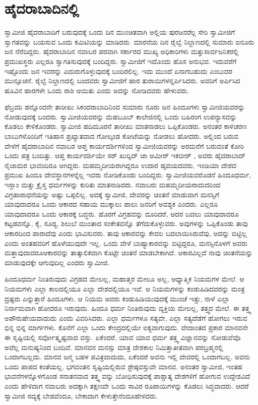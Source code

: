 
\chapter{ಹೈದರಾಬಾದಿನಲ್ಲಿ}

 ಸ್ವಾಮೀಜಿ ಹೈದರಾಬಾದಿಗೆ ಬರುವುದಕ್ಕೆ ಒಂದು ದಿನ ಮುಂಚಿತವಾಗಿ ಅಲ್ಲಿಯ ಪುರಜನರೆಲ್ಲ ಸೇರಿ ಸ್ವಾಮೀಜಿಗೆ ಸ್ವಾಗತವನ್ನು ಬಯಸುವ ಒಂದು ಕಮಿಟಿಯನ್ನು ಮಾಡಿದರು. ಮಾರನೆಯ ದಿನ ರೈಲ್ವೆ ನಿಲ್ದಾಣದಲ್ಲಿ ಸುಮಾರು ಐನೂರು ಜನ ನೆರೆದಿದ್ದರು. ಹೈದರಾಬಾದಿನ ನವಾಬರ ಪರವಾಗಿ ಸರ್ಕಾರದ ಮುಖ್ಯ ಅಧಿಕಾರಿಗಳು ಮತ್ತು\break ಸಾರ್ವಜನಿಕರಲ್ಲಿ ಪ್ರಮುಖಸ್ಥರು ಎಲ್ಲರೂ ಸ್ವಾಗತಿಸುವುದಕ್ಕೆ ಬಂದಿದ್ದರು. ಸ್ವಾಮೀಜಿಗೆ ಇದೊಂದು ಹೊಸ ಅನುಭವ. ಇದುವರೆಗೆ ಇಷ್ಟೊಂದು ಜನ ಇವರನ್ನು ಎದುರುಗೊಳ್ಳುವುದಕ್ಕೆ ಬಂದಿರಲಿಲ್ಲ. ಇದು ಮುಂದೆ ಏನಾಗಬಹುದು ಎಂಬುದರ ಮುನ್ಸೂಚನೆ. ರೈಲ್ವೆ ನಿಲ್ದಾಣದಲ್ಲಿ ಬಂದವರು ಸ್ವಾಮೀಜಿಗೆ ಹಾರ ತುರಾಯಿಗಳನ್ನರ್ಪಿಸಿದರು. ಅವರಿಗೆ ಅರ್ಪಿಸಿದ ಹೂವಿನ ಹಾರಗಳೇ ಒಂದು ರಾಶಿ ಆಯಿತು ಎಂದು ಅದನ್ನು ನೋಡಿದವರು ಹೇಳುವರು. 

 ಫೆಬ್ರವರಿ ಹನ್ನೊಂದನೇ ತಾರೀಖು ಸಿಕಂದರಾಬಾದಿನಿಂದ ಸುಮಾರು ನೂರು ಜನ ಹಿಂದೂಗಳು ಸ್ವಾಮೀಜಿಯವರನ್ನು ನೋಡುವುದಕ್ಕೆ ಬಂದರು. ಸ್ವಾಮೀಜಿಯವರನ್ನು ಮೆಹಬೂಬ್ ಕಾಲೇಜಿನಲ್ಲಿ ಒಂದು ಬಹಿರಂಗ ಉಪನ್ಯಾಸವನ್ನು ಕೊಡಲು ಕೇಳಿಕೊಂಡರು. ಸ್ವಾಮೀಜಿ ಹದಿಮೂರನೆ ತಾರೀಖು ಮಾತನಾಡಲು ಒಪ್ಪಿಕೊಂಡರು. ಅನಂತರ ಕಾಳಿಚರಣ ಬಾಬುಗಳೊಂದಿಗೆ ಇತಿಹಾಸ ಪ್ರಖ್ಯಾತವಾದ ಗೋಲ್ಕಂಡ ಕೋಟೆಯನ್ನು ನೋಡಲು ಹೋದರು. ಅಲ್ಲಿಂದ ಬರುವ ವೇಳೆಗೆ ಹೈದರಾಬಾದಿನ ನವಾಬರ ಆಪ್ತ ಕಾರ್ಯದರ್ಶಿಗಳಿಂದ ಸ್ವಾಮೀಜಿಯವರನ್ನು ಅರಮನೆಗೆ ಬರುವಂತೆ ಕೋರಿ ಒಂದು ಪತ್ರ ಬಂದಿತ್ತು. ಆಪ್ತ ಕಾರ್ಯದರ್ಶಿಯೇ ಸರ್ ಖುರ್‍ಶಿದ್ ಜಾ ಆಮೀರ್ ಇಕಬೀರ್ , ಅವರು ಹೈದರಾಬಾದ್ ನೈಜಾಮರ ಭಾವಂದಿರೂ ಆಗಿದ್ದರು. ಮಹಮ್ಮದೀಯರಾಗಿದ್ದರೂ ಉದಾರ ಹೃದಯದವರು, ಇಂಡಿಯಾ ದೇಶದ ಪ್ರಮುಖ ಹಿಂದೂ ದೇವಸ್ಥಾನಗಳನ್ನೆಲ್ಲ ಇವರು ನೋಡಿಕೊಂಡು ಬಂದಿದ್ದರು. ಸ್ವಾಮೀಜಿಯವರೊಡನೆ ಹಿಂದೂಧರ್ಮ, ಇಸ್ಲಾಂ ಮತ್ತು ಕ್ರೈಸ್ತ ಧರ್ಮಗಳನ್ನು ಕುರಿತು ಮಾತನಾಡಿದರು. ನವಾಬರು ಮಹಮ್ಮದೀಯರಾದುದರಿಂದ ವಿಗ್ರಹಾರಾಧನೆಯನ್ನು ಅಷ್ಟು ಒಪ್ಪಲಿಲ್ಲ. ಅದಕ್ಕೆ ಸ್ವಾಮೀಜಿ, ದೇವರನ್ನು ಚಿಂತನೆ ಮಾಡುವಾಗ ಮನಸ್ಸಿಗೆ ಯಾವುದಾದರೂ ಒಂದು ಆಕಾರದ ಸಹಾಯ ಮುಕ್ಕಾಲು ಪಾಲು ಜನರಿಗೆ ಅವಶ್ಯಕ ಎಂದರು. ಎಲ್ಲರೂ ಯಾವುದಾದರೂ ಒಂದು ಆಕಾರಕ್ಕೆ ಬದ್ಧರು. ಹೊರಗೆ ವಿಗ್ರಹವನ್ನು ದೂರಿದರೆ, ಅದರ ಬದಲು ಯಾವುದಾದರೂ ಕಟ್ಟಡವನ್ನೊ, ಕೈ, ಸೂರ‍್ಯ, ಶಿಲುಬೆ ಮುಂತಾದ ಸಂಕೇತವನ್ನೊ ತೆಗೆದುಕೊಳ್ಳುವರು. ಅವುಗಳನ್ನು ಒಪ್ಪಿಕೊಂಡು ತಾವು ಆಕಾರದಿಂದ ಪಾರಾದೆವು ಎಂದು ಭಾವಿಸುವರು. ತಾವು ಆಕಾರವನ್ನು ಕೇವಲ ಬದಲಾಯಿಸಿರುವೆವು, ಅದನ್ನು ಬಿಟ್ಟಿಲ್ಲ ಎಂದು ಅಂತಹವರಿಗೆ ಹೊಳೆಯುವುದೇ ಇಲ್ಲ. ಒಂದು ವೇಳೆ ಬಾಹ್ಯಾಕಾರವನ್ನು ಬಿಟ್ಟಿದ್ದರೂ, ಮನಸ್ಸಿನೊಳಗೆ ಅವರು ಮತ್ತಾವುದಾದರೂ\break ಆಕಾರವನ್ನು ತಾತ್ಕಾಲಿಕವಾಗಿ ಕೊಟ್ಟೇ ಚಿಂತನೆ ಮಾಡಬೇಕಾಗಿದೆ. ಆಕಾರವಿಲ್ಲದೆ ನಾವು ಚಿಂತನೆಯನ್ನು ಮಾಡುವುದಕ್ಕೇ ಆಗುವುದಿಲ್ಲ ಎಂದರು ಸ್ವಾಮೀಜಿ.

 ಹಿಂದೂಧರ್ಮ ನಿಂತಿರುವುದು ವಿಗ್ರಹದ ಮೇಲಲ್ಲ, ಮಹಾತ್ಮರ ಮೇಲೂ ಅಲ್ಲ, ಆಧ್ಯಾತ್ಮಿಕ ನಿಯಮಗಳ ಮೇಲೆ. ಆ ನಿಯಮಗಳು ಎಲ್ಲಾ ಕಾಲದಲ್ಲಿಯೂ ಎಲ್ಲಾ ದೇಶದಲ್ಲಿಯೂ ಇವೆ. ಆ ನಿಯಮಗಳನ್ನು ಕಂಡುಹಿಡಿದವರನ್ನು ಮಂತ್ರ ದ್ರಷ್ಟರು ಎನ್ನುತ್ತಾರೆ ಹಿಂದೂಗಳು. ಆ ನಿಯಮ ಅವರು ಕಂಡುಹಿಡಿಯುವುದಕ್ಕೆ ಮುಂಚೆ ಇತ್ತು, ನಾಳೆ ಎಲ್ಲಾ ನಿರ್ನಾಮವಾಗಿ ಹೋದರೂ ಇರುವುದು. ಹಿಂದೂ ಧರ್ಮ ನಿಂತಿರುವುದು ವ್ಯಕ್ತಿಯ ಮೇಲಲ್ಲ, ತತ್ತ್ವದ ಮೇಲೆ. ಈ ತತ್ತ್ವ ಅಪೌರುಷೇಯವಾದುದು ಎಂದು ವಿವರಿಸಿದರು. ಎಲ್ಲಾ ಧರ್ಮಗಳೂ ಸತ್ಯವೇ, ಎಲ್ಲಾ ಸತ್ಯದೆಡೆಗೆ ಹೋಗಲು ಇರುವ ಭಿನ್ನ ಭಿನ್ನ ಮಾರ್ಗಗಳು. ಕೊನೆಗೆ ಎಲ್ಲಾ ಒಂದು ಕೇಂದ್ರದಲ್ಲಿಯೇ ಐಕ್ಯವಾಗುವುದು. ವೇದಾಂತದ ಪ್ರಕಾರ ಮಾನವನೇ ಈ ಸೃಷ್ಟಿಯಲ್ಲಿ ಸರ್ವೋತ್ಕೃಷ್ಟವಾದ ವಸ್ತು. ಏಕೆಂದರೆ, ಯಾವ ಯಾವ ಧರ್ಮ ತತ್ತ್ವ ವಿಜ್ಞಾನವನ್ನು ನೋಡುವೆವೊ ಅವೆಲ್ಲ ಮನುಷ್ಯನಿಂದ ಬಂದಿವೆ. ಮಾನವನ ಮನಸ್ಸು ಮಾತ್ರ ದೇಶಕಾಲ ನಿಮಿತ್ತಾತೀತವಾಗಿ ಪರಬ್ರಹ್ಮನಲ್ಲಿ ಒಂದಾಗಬಲ್ಲದು. ಮಾನವ ಜನ್ಮ ಬಹಳ ಪವಿತ್ರವಾದುದು, ಏಕೆಂದರೆ ಅವನು ಇಲ್ಲಿ ದೇವರಲ್ಲಿ ಒಂದಾಗಬಲ್ಲ. ಅವನು ಒಂದು ಪಾಪದ ಕಂತೆಯಲ್ಲ. ಭಗವಂತನ ಸೃಷ್ಟಿಯಲ್ಲಿರುವ ಶ್ರೇಷ್ಠವಸ್ತುವೇ ಮಾನವ. ಅನಂತರ ಸ್ವಾಮೀಜಿ, ಇಂತಹ ಭಾವನೆಗಳನ್ನೊಳಗೊಂಡ ಸನಾತನವಾದ ತತ್ತ್ವ ವನ್ನು ಬೋಧಿಸುವುದಕ್ಕೆ ಪಾಶ್ಚಾತ್ಯ ದೇಶಗಳಿಗೆ ಹೋಗುವ ಉದ್ದೇಶವಿದೆ ಎಂದು ಹೇಳಿದಾಗ ನವಾಬರು ಅದಕ್ಕಾಗಿ ತಕ್ಷಣವೇ ಒಂದು ಸಾವಿರ ರೂಪಾಯಿಗಳನ್ನು ಕೊಡಲು ಸಿದ್ಧವಾದರು. ಆದರೆ ಸ್ವಾಮೀಜಿ ಸದ್ಯಕ್ಕೆ ಬೇಡವೆಂದೂ, ಬೇಕಾದಾಗ ಕೇಳುತ್ತೇನೆಂದೂ\break ಹೇಳಿದರು.

